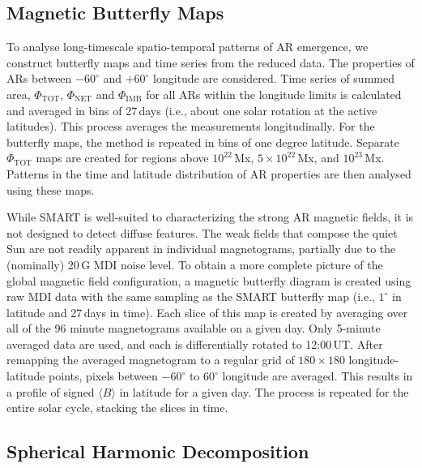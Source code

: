 \documentclass[namedreferences]{solarphysics}
\begin{document}
\begin{article}
\subsection{Magnetic Butterfly Maps}\label{sub:magbutt}

To analyse long-timescale spatio-temporal patterns of AR emergence, we construct butterfly maps and time series from the reduced data. The properties of ARs between $-60^\circ$ and $+60^\circ$ longitude are considered. Time series of summed area, $\Phi_{\mathrm{TOT}}$, $\Phi_{\mathrm{NET}}$ and $\Phi_{\mathrm{IMB}}$ for all ARs within the longitude limits is calculated and averaged in bins of 27\,days (i.e., about one solar rotation at the active latitudes). This process averages the measurements longitudinally. 
For the butterfly maps, the method is repeated in bins of one degree latitude. Separate $\Phi_{\mathrm{TOT}}$ maps are created for regions above $10^{22}$\,Mx, $5\times10^{22}$\,Mx, and $10^{23}$\,Mx. Patterns in the time and latitude distribution of AR properties are then analysed using these maps.


While SMART is well-suited to characterizing the strong AR magnetic fields, it is not designed to detect diffuse features. The weak fields that compose the quiet Sun are not readily apparent in individual magnetograms, partially due to the (nominally) 20\,G MDI noise level. To obtain a more complete picture of the global magnetic field configuration, a magnetic butterfly diagram is created using raw MDI data with the same sampling as the SMART butterfly map (i.e., $1^\circ$ in latitude and 27\,days in time). Each slice of this map is created by averaging over all of the 96 minute magnetograms available on a given day. Only 5-minute averaged data are used, and each is differentially rotated to 12:00\,UT. After remapping the averaged magnetogram to a regular grid of $180\times180$ longitude-latitude points, pixels between $-60^{\circ}$ to $60^{\circ}$ longitude are averaged. This results in a profile of signed $\langle {B} \rangle$ in latitude for a given day. The process is repeated for the entire solar cycle, stacking the slices in time. 


\subsection{Spherical Harmonic Decomposition}\label{sub:sphharm}


\end{article}
\end{document}
